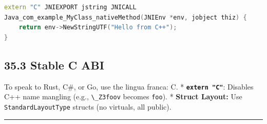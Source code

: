 \begin{lstlisting}[language={C++}]
extern "C" JNIEXPORT jstring JNICALL
Java_com_example_MyClass_nativeMethod(JNIEnv *env, jobject thiz) {
    return env->NewStringUTF("Hello from C++");
}
\end{lstlisting}

\hypertarget{stable-c-abi}{%
\subsection{35.3 Stable C ABI}\label{stable-c-abi}}

To speak to Rust, C\#, or Go, use the lingua franca: C. *
\textbf{\passthrough{\lstinline!extern "C"!}}: Disables C++ name
mangling (e.g., \passthrough{\lstinline!\_Z3foov!} becomes
\passthrough{\lstinline!foo!}). * \textbf{Struct Layout:} Use
\passthrough{\lstinline!StandardLayoutType!} structs (no virtuals, all
public).

\begin{center}\rule{0.5\linewidth}{0.5pt}\end{center}
